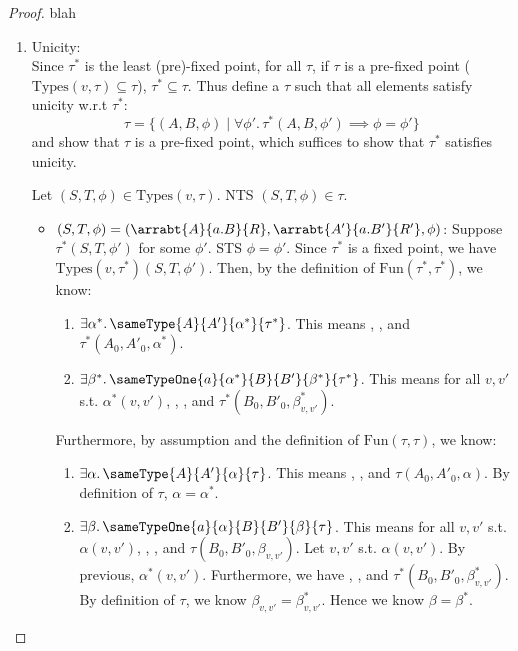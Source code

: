 \begin{proof}
blah
\begin{enumerate}
\item Unicity:\\
Since $\tau^*$ is the least (pre)-fixed point, for all $\tau$, if $\tau$ is a pre-fixed point 
($\text{Types}(v,\tau) \subseteq \tau$), $\tau^* \subseteq \tau$. Thus define a $\tau$ such that all elements 
satisfy unicity w.r.t $\tau^*$: 
\[\tau = \{(A,B,\phi) \mid \forall \phi'.\, \tau^*(A,B,\phi') \implies \phi = \phi'\}\]
and show that $\tau$ is a pre-fixed point, which suffices to show that $\tau^*$ satisfies unicity.

Let $(S,T,\phi) \in \text{Types}(v,\tau)$. NTS $(S,T,\phi) \in \tau$.
\begin{itemize}
  \item $(S,T,\phi) = (\arrabt{A}{a.B}{R}, \arrabt{A'}{a.B'}{R'}, \phi)$:
  Suppose $\tau^*(S,T,\phi')$ for some $\phi'$. STS $\phi = \phi'$.
  Since $\tau^*$ is a fixed point, we have $\text{Types}(v,\tau^*)(S,T,\phi')$.
  Then, by the definition of $\text{Fun}(\tau^*,\tau^*)$, we know:
  \begin{enumerate}
  \item $\exists \alpha^*.\, \sameType{A}{A'}{\alpha^*}{\tau^*}$. This means 
  , , and $\tau^*(A_0,A'_0,\alpha^*)$.
  \item $\exists \beta^*.\, \sameTypeOne{a}{\alpha^*}{B}{B'}{\beta^*}{\tau^*}$. This means
  for all $v,v'$ s.t. $\alpha^*(v,v')$, , , and $\tau^*(B_0,B'_0,\beta^*_{v,v'})$.
  \end{enumerate}
  Furthermore, by assumption and the definition of $\text{Fun}(\tau,\tau)$, we know:
  \begin{enumerate}
  \item $\exists \alpha.\, \sameType{A}{A'}{\alpha}{\tau}$. This means 
  , , and $\tau(A_0,A'_0,\alpha)$. By definition of $\tau$, $\alpha = \alpha^*$.
  \item $\exists \beta.\, \sameTypeOne{a}{\alpha}{B}{B'}{\beta}{\tau}$. This means
  for all $v,v'$ s.t. $\alpha(v,v')$, , , and $\tau(B_0,B'_0,\beta_{v,v'})$.
  Let $v,v'$ s.t. $\alpha(v,v')$. By previous, $\alpha^*(v,v')$. Furthermore, we have
  , , and $\tau^*(B_0,B'_0,\beta^*_{v,v'})$.
  By definition of $\tau$, we know $\beta_{v,v'} = \beta^*_{v,v'}$. Hence we know $\beta = \beta^*$.
  \end{enumerate}

\end{itemize}
\end{enumerate}
\end{proof}
